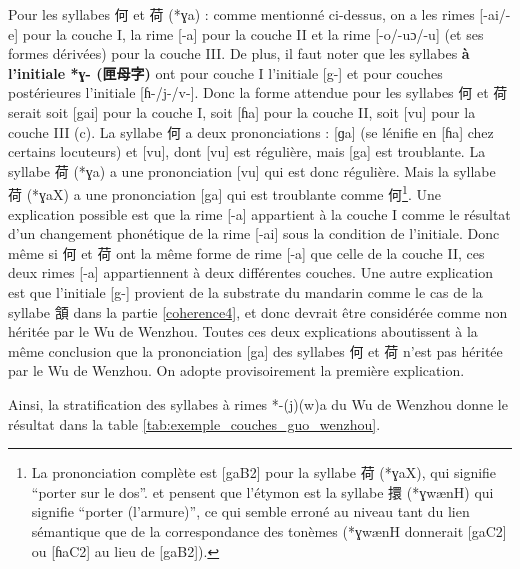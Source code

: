 \documentclass{scrbook}
\newcounter{c}[subsubsection]
\newcommand{\termyyx}[1]{\textbf{#1}}
\begin{document}
\begin{sloppypar}
Pour les syllabes 何 et 荷 (*ɣa) : comme mentionné ci-dessus, on a les rimes [-ai/-e] pour la couche I, la rime [-a] pour la couche II et la rime [-o/-uɔ/-u] (et ses formes dérivées) pour la couche III. De plus, il faut noter que les syllabes \termyyx{à l'initiale *ɣ- (匣母字)} ont pour couche I l'initiale [g-] et pour couches postérieures l'initiale [ɦ-/j-/v-]. Donc la forme attendue pour les syllabes 何 et 荷 serait soit [gai] pour la couche I, soit [ɦa] pour la couche II, soit [vu] pour la couche III (c). La syllabe 何 a deux prononciations : [ɡa] (se lénifie en [ɦa] chez certains locuteurs) et [vu], dont [vu] est régulière, mais [ga] est troublante. La syllabe 荷 (*ɣa) a une prononciation [vu] qui est donc régulière. Mais la syllabe 荷 (*ɣaX) a une prononciation [ga] qui est troublante comme 何\footnote{La prononciation complète est [gaB2] pour la syllabe 荷 (*ɣaX), qui signifie ``porter sur le dos''. \textcite[180]{Zhengzhang2008wenzhou} et \textcite[120]{You1998Wenzhou} pensent que l'étymon est la syllabe 擐 (*ɣwænH) qui signifie ``porter (l'armure)'', ce qui semble erroné au niveau tant du lien sémantique que de la correspondance des tonèmes (*ɣwænH donnerait [gaC2] ou [ɦaC2] au lieu de [gaB2]).}. Une explication possible est que la rime [-a] appartient à la couche I comme le résultat d'un changement phonétique de la rime [-ai] sous la condition de l'initiale. Donc même si 何 et 荷 ont la même forme de rime [-a] que celle de la couche II, ces deux rimes [-a] appartiennent à deux différentes couches. Une autre explication est que l'initiale [g-] provient de la substrate du mandarin comme le cas de la syllabe 頷 dans la partie \ref{coherence4}, et donc devrait être considérée comme non héritée par le Wu de Wenzhou. Toutes ces deux explications aboutissent à la même conclusion que la prononciation [ga] des syllabes 何 et 荷 n'est pas héritée par le Wu de Wenzhou. On adopte provisoirement la première explication.

Ainsi, la stratification des syllabes à rimes *-(j)(w)a du Wu de Wenzhou donne le résultat dans la table \ref{tab:exemple_couches_guo_wenzhou}.


\end{sloppypar}
\end{document}
